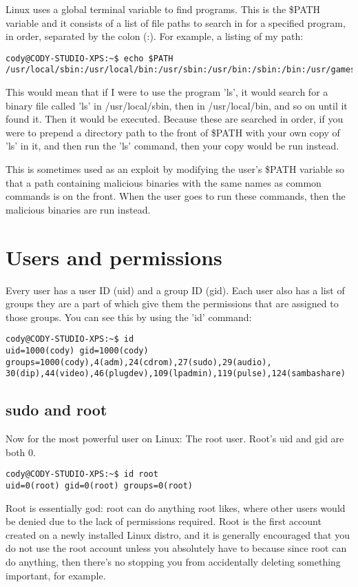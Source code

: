 \documentclass{article}
\begin{document}
Linux uses a global terminal variable to find programs. This is the \$PATH variable and it consists of a list of file paths to search in for a specified program, in order, separated by the colon (:). For example, a listing of my path:
\begin{verbatim}
cody@CODY-STUDIO-XPS:~$ echo $PATH
/usr/local/sbin:/usr/local/bin:/usr/sbin:/usr/bin:/sbin:/bin:/usr/games
\end{verbatim}
This would mean that if I were to use the program 'ls', it would search for a binary file called 'ls' in /usr/local/sbin, then in /usr/local/bin, and so on until it found it. Then it would be executed. Because these are searched in order, if you were to prepend a directory path to the front of \$PATH with your own copy of 'ls' in it, and then run the 'ls' command, then your copy would be run instead.

This is sometimes used as an exploit by modifying the user's \$PATH variable so that a path containing malicious binaries with the same names as common commands is on the front. When the user goes to run these commands, then the malicious binaries are run instead.

\section{Users and permissions}
Every user has a user ID (uid) and a group ID (gid). Each user also has a list of groups they are a part of which give them the permissions that are assigned to those groups. You can see this by using the 'id' command:
\begin{verbatim}
cody@CODY-STUDIO-XPS:~$ id
uid=1000(cody) gid=1000(cody) groups=1000(cody),4(adm),24(cdrom),27(sudo),29(audio),
30(dip),44(video),46(plugdev),109(lpadmin),119(pulse),124(sambashare)
\end{verbatim}

\subsection{sudo and root}
Now for the most powerful user on Linux: The root user. Root's uid and gid are both 0.
\begin{verbatim}
cody@CODY-STUDIO-XPS:~$ id root
uid=0(root) gid=0(root) groups=0(root)
\end{verbatim}
Root is essentially god: root can do anything root likes, where other users would be denied due to the lack of permissions required. Root is the first account created on a newly installed Linux distro, and it is generally encouraged that you do not use the root account unless you absolutely have to because since root can do anything, then there's no stopping you from accidentally deleting something important, for example.
\end{document}
